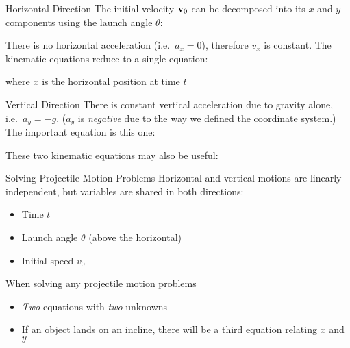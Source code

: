 \documentclass[12pt,compress,aspectratio=169]{beamer}
\newcommand{\iii}{\ensuremath\hat{\bm{\imath}}}
\newcommand{\jjj}{\ensuremath\hat{\bm{\jmath}}}
\newcommand{\mb}[1]{\ensuremath\mathbf{#1}}
\newcommand{\eq}[2]{\vspace{#1}{\Large\begin{displaymath}#2\end{displaymath}}}
\begin{document}
\begin{frame}{Horizontal Direction}
  The initial velocity $\mb{v}_0$ can be decomposed into its $x$ and $y$
  components using the launch angle $\theta$:

  \eq{-.2in}{
    \mb{v}_0=v_x\iii + v_y\jjj =
    \left[v_0\cos\theta\right]\iii + \left[v_0\sin\theta\right]\jjj
  }

  There is no horizontal acceleration (i.e.\ $a_x=\num{0}$), therefore $v_x$ is
  constant. The kinematic equations reduce to a single equation:

  \eq{-.2in}{
    x=v_xt=\left[v_0\cos\theta\right] t
  }

  where $x$ is the horizontal position at time $t$ %
\end{frame}




\begin{frame}{Vertical Direction}
  There is constant vertical acceleration due to gravity alone, i.e.\
  $a_y=-g$. ($a_y$ is \emph{negative} due to the way we defined the
  coordinate system.) The important equation is this one:

  \eq{-.2in}{
    y = \left[v_0\sin\theta\right]t-\frac12gt^2
  }

  These two kinematic equations may also be useful:

  \vspace{-.3in}{\Large
    \begin{align*}
      v_y &= \left[v_0\sin\theta\right] -gt\\
      v_y^2&=\left[v_0^2\sin^2\theta\right]-2gy
    \end{align*}
  }
\end{frame}



\begin{frame}{Solving Projectile Motion Problems}
  Horizontal and vertical motions are linearly independent, but variables are
  shared in both directions:
  \begin{itemize}
  \item Time $t$
  \item Launch angle $\theta$ (above the horizontal)
  \item Initial speed $v_0$
  \end{itemize}
  
  \vspace{.25in}When solving any projectile motion problems
  \begin{itemize}
  \item \emph{Two} equations with \emph{two} unknowns
  \item If an object lands on an incline, there will be a third equation
    relating $x$ and $y$
  \end{itemize}
\end{frame}
\end{document}

